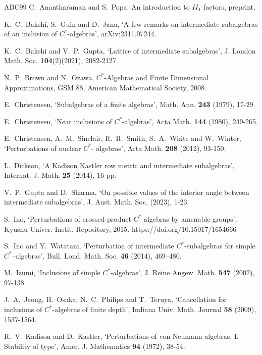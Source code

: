 \documentclass{amsart}
\numberwithin{equation}{section}
\newcommand{\1}{\mathbf{1}}
\begin{document}
\begin{thebibliography}{ABC99}
 C.~Anantharaman and S.~Popa: An introduction to $II_1$ factors, preprint.

 K.~C.~Bakshi, S.~Guin and D.~Jana, `A few remarks on intermediate subalgebras of an inclusion of $C^*$-algebras', arXiv:2311.07244.

  
 K.~C.~Bakshi and V.~P.~Gupta, `Lattice of intermediate subalgebras', J. London Math. Soc. \textbf{104}(2)(2021), 2082-2127.


 N.~P.~Brown and N.~Ozawa, $C^*$-Algebras and Finite Dimensional Approximations, GSM 88, American Mathematical Society, 2008.  



 E.~Christensen, `Subalgebras of a finite algebras', Math. Ann. {\bf 243} (1979), 17-29. 

 E.~Christensen, `Near inclusions of $C^*$-algebras', Acta Math. \textbf{144} (1980), 249-265. 

 E.~Christensen, A.~M.~Sinclair, R.~R.~Smith, S.~A.~White
  and W.~Winter, `Perturbations of nuclear $C^*$- algebras', Acta
  Math. \textbf{208} (2012), 93-150.

 L.~Dickson, `A Kadison Kastler row metric and intermediate subalgebras', Internat. J. Math. \textbf{25} (2014), 16 pp.
  
 V.~P.~Gupta and D.~Sharma, `On possible values of the interior angle between intermediate subalgebras', J. Aust. Math. Soc. (2023), 1-23.


 S.~Ino, `Perturbations of crossed product $C^*$-algebras
  by amenable groups', Kyushu Univer. Instit. Repository, 2015. https://doi.org/10.15017/1654666

  
 S.~Ino and Y.~Watatani, ‘Perturbation of intermediate
  $C^{*}$-subalgebras for simple $C^{*}$–algebras’, Bull.
  Lond. Math. Soc. \textbf{46} (2014), 469–480.

 M.~Izumi, `Inclusions of simple $C^*$-algebras', J. Reine Angew. Math. \textbf{547} (2002), 97-138.

 J.~A.~Jeong, H.~Osaka, N.~C.~Philips and T.~Teruya, `Cancellation for inclusions of $C^*$-algebras of finite depth', Indiana Univ. Math. Journal {\bf 58} (2009), 1537-1564.

 R.~V.~Kadison and D.~Kastler, `Perturbations of von Neumann algebras. I. Stability of type', Amer. J. Mathematics {\bf 94} (1972), 38-54. 


\end{thebibliography}
\end{document}
